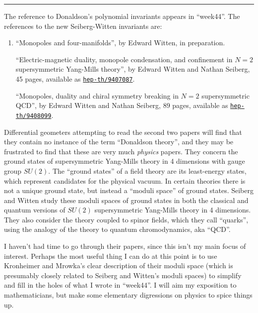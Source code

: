\documentclass{article}
\begin{document}
\begin{center}\rule{0.5\linewidth}{0.5pt}\end{center}

The reference to Donaldson's polynomial invariants appears in
``week44''. The references to the new Seiberg-Witten invariants are:

\begin{enumerate}
\def\labelenumi{\arabic{enumi})}
\setcounter{enumi}{1}
\item
  ``Monopoles and four-manifolds'', by Edward Witten, in preparation.

  ``Electric-magnetic duality, monopole condensation, and confinement in
  \(N=2\) supersymmetric Yang-Mills theory'', by Edward Witten and
  Nathan Seiberg, 45 pages, available as
  \href{http://xxx.lanl.gov/abs/hep-th/9407087}{\texttt{hep-th/9407087}}.

  ``Monopoles, duality and chiral symmetry breaking in \(N=2\)
  supersymmetric QCD'', by Edward Witten and Nathan Seiberg, 89 pages,
  available as
  \href{http://xxx.lanl.gov/abs/hep-th/9408099}{\texttt{hep-th/9408099}}.
\end{enumerate}

Differential geometers attempting to read the second two papers will
find that they contain no instance of the term ``Donaldson theory'', and
they may be frustrated to find that these are very much \emph{physics}
papers. They concern the ground states of supersymmetric Yang-Mills
theory in 4 dimensions with gauge group \(SU(2)\). The ``ground states''
of a field theory are its least-energy states, which represent
candidates for the physical vacuum. In certain theories there is not a
unique ground state, but instead a ``moduli space'' of ground states.
Seiberg and Witten study these moduli spaces of ground states in both
the classical and quantum versions of \(SU(2)\) supersymmetric
Yang-Mills theory in 4 dimensions. They also consider the theory coupled
to spinor fields, which they call ``quarks'', using the analogy of the
theory to quantum chromodynamics, aka ``QCD''.

I haven't had time to go through their papers, since this isn't my main
focus of interest. Perhaps the most useful thing I can do at this point
is to use Kronheimer and Mrowka's clear description of their moduli
space (which is presumably closely related to Seiberg and Witten's
moduli spaces) to simplify and fill in the holes of what I wrote in
``week44''. I will aim my exposition to mathematicians, but make some
elementary digressions on physics to spice things up.
\end{document}
